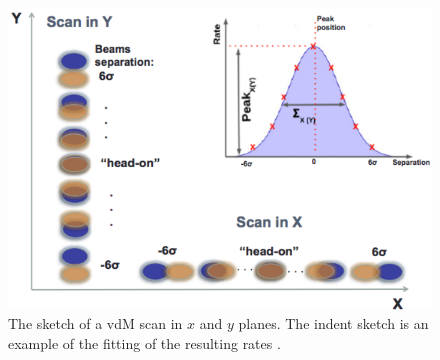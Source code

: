 \begin{center}
  \begin{figure}[ht]
    \centering
    \includegraphics[scale=.37]{Chapter3/vdm_sketch.png}
    \caption[Sketch of a vdM scan in x and y planes and example of fitting resulting rates]{ The sketch of a vdM scan in $x$ and $y$ planes. The indent sketch is an example of the fitting of the resulting rates \cite{vdM_sketch}.}
    \label{vdm_sketch}
  \end{figure}
\end{center}
